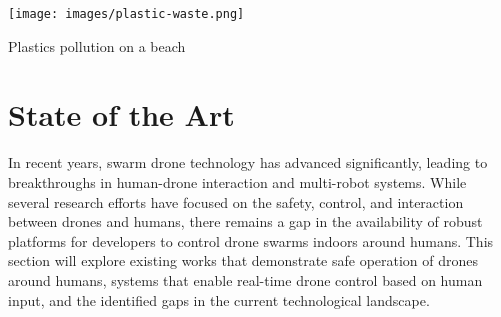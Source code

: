 



\begin{marginfigure}[-5cm] %
    \centering
    \texttt{[image: images/plastic-waste.png]}
    \caption{Plastics pollution on a beach}
    \label{fig:plastics}
\end{marginfigure}
\section{State of the Art}
In recent years, swarm drone technology has advanced significantly, leading to breakthroughs in human-drone interaction and multi-robot systems. While several research efforts have focused on the safety, control, and interaction between drones and humans, there remains a gap in the availability of robust platforms for developers to control drone swarms indoors around humans. This section will explore existing works that demonstrate safe operation of drones around humans, systems that enable real-time drone control based on human input, and the identified gaps in the current technological landscape.

